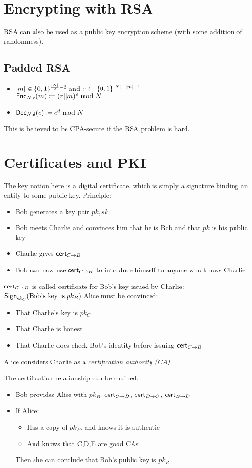 \documentclass[12pt]{article}
\begin{document}
\section{Encrypting with RSA}
RSA can also be used as a public key encryption scheme (with some addition of randomness). 
\subsection{Padded RSA}
\begin{itemize}
	\item $|m| \in \{0, 1\}^{\frac{|N|}{2}-2}$ and $r\leftarrow \{0, 1\}^{|N|-|m|-1}$\\
	$\operatorname{\mathsf{Enc}}_{N,e}(m) \coloneqq (r||m)^e \bmod{N}$
	\item $\operatorname{\mathsf{Dec}}_{N,d}(c) \coloneqq c^d \bmod{N}$
\end{itemize}
This is believed to be CPA-secure if the RSA problem is hard.

\section{Certificates and PKI}
The key notion here is a digital certificate, which is simply a signature binding an entity to some public key.
Principle:
\begin{itemize}
	\item Bob generates a key pair $pk,sk$
	\item Bob meets Charlie and convinces him that he is Bob and that $pk$ is his public key
	\item Charlie gives $\mathsf{cert}_{C\rightarrow B}$
	\item Bob can now use $\mathsf{cert}_{C\rightarrow B}$ to introduce himself to anyone who knows Charlie
\end{itemize}
$\mathsf{cert}_{C\rightarrow B}$ is called certificate for Bob's key issued by Charlie: $\operatorname{\mathsf{Sign}}_{sk_C}(\text{Bob's key is }pk_B )$
\newpage
Alice must be convinced:
\begin{itemize}
	\item That Charlie's key is $pk_C$
	\item That Charlie is honest
	\item That Charlie does check Bob's identity before issuing $\mathsf{cert}_{C\rightarrow B}$
\end{itemize}
Alice considers Charlie as a \emph{certification authority (CA)}

The certification relationship can be chained:
\begin{itemize}
	\item Bob provides Alice with $pk_B$, $\mathsf{cert}_{C\rightarrow B}$, $\mathsf{cert}_{D\rightarrow C}$, $\mathsf{cert}_{E\rightarrow D}$
	\item If Alice:
	\begin{itemize}
		\item Has a copy of $pk_E$, and knows it is authentic
		\item And knows that C,D,E are good CAs
	\end{itemize}
	Then she can conclude that Bob's public key is $pk_B$
\end{itemize}
\end{document}
